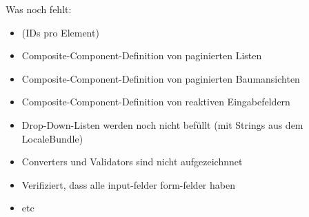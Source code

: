 \documentclass{article}
\begin{document}
\long{}

\newcommand{\component}[2]{\subsubsection{#1 (\texttt{#2})}}

\newcommand{\BTN}{\tag{h}{commandButton}}
\newcommand{\LNK}{\tag{h}{outputLink}}
\newcommand{\INP}{\tag{h}{inputText}}
\newcommand{\PAS}{\tag{h}{inputSecret}}
\newcommand{\DRP}{\tag{h}{selectOneMenu}}
\newcommand{\CHK}{\tag{h}{selectBooleanCheckbox}}
\newcommand{\OUT}{\tag{h}{outputText}}
\newcommand{\LST}{\tag{bibi}{paginatedList}}
\newcommand{\TXT}{\tag{h}{inputTextarea}}
\newcommand{\PRM}{\tag{f}{viewParam}}
\newcommand{\FRM}{\tag{h}{form}}

Was noch fehlt:


\begin{itemize}
    \item (IDs pro Element)
    \item Composite-Component-Definition von paginierten Listen
    \item Composite-Component-Definition von paginierten Baumansichten
    \item Composite-Component-Definition von reaktiven Eingabefeldern
    \item Drop-Down-Listen werden noch nicht befüllt (mit Strings aus dem LocaleBundle)
     
    \item Converters und Validators sind nicht aufgezeichnnet
    \item Verifiziert, dass alle input-felder form-felder haben
    \item {} etc
\end{itemize}
\end{document}
